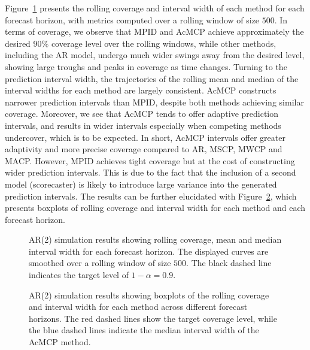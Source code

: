 \documentclass[
  11pt,
  a4paper,
]{article}
\theoremstyle{plain}
\theoremstyle{remark}
\begin{document}
Figure~\ref{fig-AR2_cov} presents the rolling coverage and interval
width of each method for each forecast horizon, with metrics computed
over a rolling window of size \(500\). In terms of coverage, we observe
that MPID and AcMCP achieve approximately the desired \(90\%\) coverage
level over the rolling windows, while other methods, including the AR
model, undergo much wider swings away from the desired level, showing
large troughs and peaks in coverage as time changes. Turning to the
prediction interval width, the trajectories of the rolling mean and
median of the interval widths for each method are largely consistent.
AcMCP constructs narrower prediction intervals than MPID, despite both
methods achieving similar coverage. Moreover, we see that AcMCP tends to
offer adaptive prediction intervals, and results in wider intervals
especially when competing methods undercover, which is to be expected.
In short, AcMCP intervals offer greater adaptivity and more precise
coverage compared to AR, MSCP, MWCP and MACP. However, MPID achieves
tight coverage but at the cost of constructing wider prediction
intervals. This is due to the fact that the inclusion of a second model
(scorecaster) is likely to introduce large variance into the generated
prediction intervals. The results can be further elucidated with
Figure~\ref{fig-AR2_box}, which presents boxplots of rolling coverage
and interval width for each method and each forecast horizon.

\begin{figure}


\caption{\label{fig-AR2_cov}AR(2) simulation results showing rolling
coverage, mean and median interval width for each forecast horizon. The
displayed curves are smoothed over a rolling window of size \(500\). The
black dashed line indicates the target level of \(1-\alpha=0.9\).}

\end{figure}%

\begin{figure}


\caption{\label{fig-AR2_box}AR(2) simulation results showing boxplots of
the rolling coverage and interval width for each method across different
forecast horizons. The red dashed lines show the target coverage level,
while the blue dashed lines indicate the median interval width of the
AcMCP method.}

\end{figure}%
\end{document}
